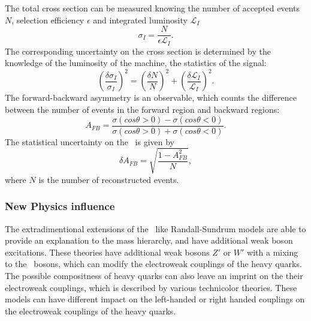 The total cross section can be measured knowing the number of accepted events $N$, selection efficiency $\epsilon$ and integrated luminosity $\mathcal{L}_I$
\begin{equation}
\sigma_I = \frac{N}{\epsilon \mathcal{L}_I}.
\label{formula:Xsection_3}
\end{equation}
The corresponding uncertainty on the cross section is determined by the knowledge of the luminosity of the machine, the statistics of the signal: 
\begin{equation}
	(\frac{\delta \sigma_I}{\sigma_I})^2 = (\frac{\delta N}{N})^2 + (\frac{\delta \mathcal{L}_I}{\mathcal{L}_I})^2.
\end{equation}
The forward-backward asymmetry is an observable, which counts the difference between the number of events in the forward region and backward regions:
\begin{equation}
A_{FB} = \frac{\sigma(cos\theta > 0) - \sigma(cos\theta < 0)}{\sigma(cos\theta > 0) + \sigma(cos\theta < 0)}.
\end{equation}
The statistical uncertainty on the \afb\ is given by 
\begin{equation}
\delta A_{FB} = \sqrt{\frac{1-A_{FB}^2}{N}},
\end{equation}
where $N$ is the number of reconstructed events. 

\subsubsection{New Physics influence}

The extradimentional extensions of the \sm\ like Randall-Sundrum models are able to provide an explanation to the mass hierarchy, and have additional weak boson excitations. 
These theories have additional weak bosons $Z'$ or $W'$ with a mixing to the \sm\ bosons, which can modify the electroweak couplings of the heavy quarks. 
The possible compositness of heavy quarks can also leave an imprint on the their electroweak couplings, which is described by various technicolor theories.
These models can have different impact on the left-handed or right handed couplings on the electroweak couplings of the heavy quarks. 

